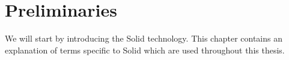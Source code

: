 \chapter{Preliminaries}
We will start by introducing the Solid technology.
This chapter contains an explanation of terms specific to Solid which are used throughout this thesis.







